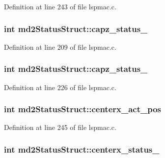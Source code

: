 Definition at line 243 of file lspmac.c.\hypertarget{structmd2StatusStruct_a719db4477f35331eaa8b7b44150e88a2}{
\subsubsection[{capz\_\-status\_\-1}]{\setlength{\rightskip}{0pt plus 5cm}int {\bf md2StatusStruct::capz\_\-status\_}}}
\label{structmd2StatusStruct_a719db4477f35331eaa8b7b44150e88a2}


Definition at line 209 of file lspmac.c.\hypertarget{structmd2StatusStruct_a3abb998bb89433aed16121d0dae6275a}{
\subsubsection[{capz\_\-status\_\-2}]{\setlength{\rightskip}{0pt plus 5cm}int {\bf md2StatusStruct::capz\_\-status\_}}}
\label{structmd2StatusStruct_a3abb998bb89433aed16121d0dae6275a}


Definition at line 226 of file lspmac.c.\hypertarget{structmd2StatusStruct_ae7924b6e91e1de82f6f7910cb3a9c9bd}{
\subsubsection[{centerx\_\-act\_\-pos}]{\setlength{\rightskip}{0pt plus 5cm}int {\bf md2StatusStruct::centerx\_\-act\_\-pos}}}
\label{structmd2StatusStruct_ae7924b6e91e1de82f6f7910cb3a9c9bd}


Definition at line 245 of file lspmac.c.\hypertarget{structmd2StatusStruct_aa619cdbd7a563408c6b825ddc4f74ebb}{
\subsubsection[{centerx\_\-status\_\-1}]{\setlength{\rightskip}{0pt plus 5cm}int {\bf md2StatusStruct::centerx\_\-status\_}}}
\label{structmd2StatusStruct_aa619cdbd7a563408c6b825ddc4f74ebb}


